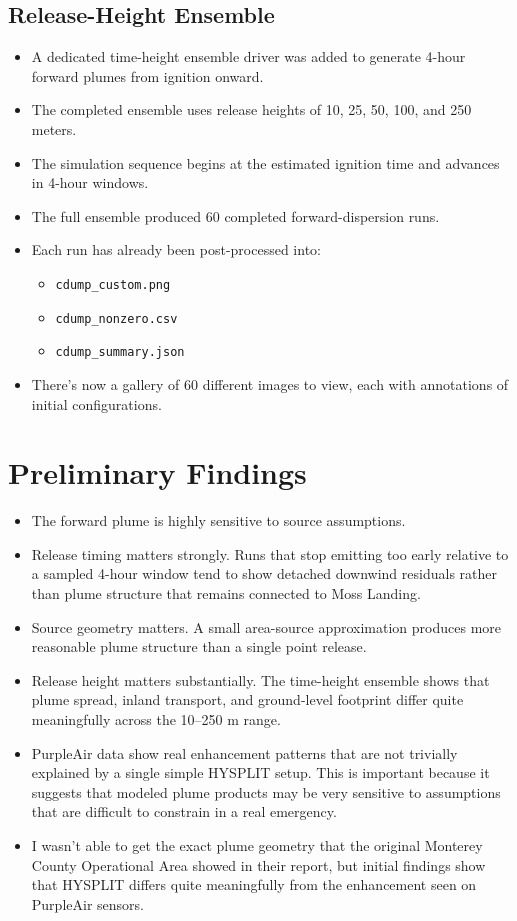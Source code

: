 \documentclass[11pt]{article}
\begin{document}
\subsection*{Release-Height Ensemble}

\begin{itemize}
\item A dedicated time-height ensemble driver was added to generate 4-hour forward plumes from ignition onward.
\item The completed ensemble uses release heights of 10, 25, 50, 100, and 250 meters.
\item The simulation sequence begins at the estimated ignition time and advances in 4-hour windows.
\item The full ensemble produced 60 completed forward-dispersion runs.
\item Each run has already been post-processed into:
\begin{itemize}
\item \texttt{cdump\_custom.png}
\item \texttt{cdump\_nonzero.csv}
\item \texttt{cdump\_summary.json}
\end{itemize}
\item There's now a gallery of 60 different images to view, each with annotations of initial configurations.
\end{itemize}

\section*{Preliminary Findings}

\begin{itemize}
\item The forward plume is highly sensitive to source assumptions.
\item Release timing matters strongly. Runs that stop emitting too early relative to a sampled 4-hour window tend to show detached downwind residuals rather than plume structure that remains connected to Moss Landing.
\item Source geometry matters. A small area-source approximation produces more reasonable plume structure than a single point release.
\item Release height matters substantially. The time-height ensemble shows that plume spread, inland transport, and ground-level footprint differ quite meaningfully across the 10--250 m range.
\item PurpleAir data show real enhancement patterns that are not trivially explained by a single simple HYSPLIT setup. This is important because it suggests that modeled plume products may be very sensitive to assumptions that are difficult to constrain in a real emergency.
\item I wasn't able to get the exact plume geometry that the original Monterey County Operational Area showed in their report, but initial findings show that HYSPLIT differs quite meaningfully from the enhancement seen on PurpleAir sensors.
\end{itemize}
\end{document}
